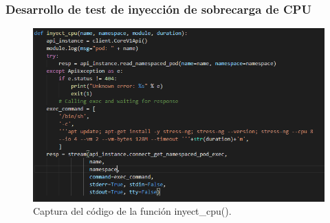 \subsubsection{Desarrollo de test de inyección de sobrecarga de CPU}
\label{sec:sobrecarga_de_CPU}
\begin{figure}[htpb!]
	\centering
	\includegraphics[width=0.95\columnwidth]{images/captures/codigo/Capture_inyect_cpu.PNG}
	\caption{Captura del código de la función inyect\_cpu().}
	\label{fig:codi03}
\end{figure}

